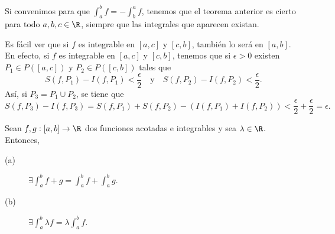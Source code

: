 \begin{observation}
\normalfont Si convenimos para que $\displaystyle \int^{b}_{a} f = - \int^{a}_{b} f $, tenemos que el teorema anterior es cierto para todo $\displaystyle a,b,c \in \R $, siempre que las integrales que aparecen existan.
\end{observation}
\begin{observation}
	\normalfont Es fácil ver que si $\displaystyle f $ es integrable en $\displaystyle \left[a,c\right]  $ y $\displaystyle \left[c,b\right]  $, también lo será en $\displaystyle \left[a,b\right]  $. En efecto, si $\displaystyle f $ es integrable en $\displaystyle \left[a,c\right]  $ y $\displaystyle \left[c,b\right]  $, tenemos que si $\displaystyle \epsilon > 0 $ existen $\displaystyle P_{1} \in P\left(\left[a,c\right] \right) $ y $\displaystyle P_{2} \in P\left(\left[c,b\right] \right) $ tales que
	\[ S\left(f,P_{1}\right)-I\left(f,P_{1}\right) < \frac{\epsilon }{2} \quad \text{y} \quad S\left(f,P_{2}\right)-I\left(f,P_{2}\right) < \frac{\epsilon }{2} .\]
	Así, si $\displaystyle P_{3} = P_{1} \cup P_{2} $, se tiene que
	\[ S\left(f,P_{3}\right)-I\left(f,P_{3}\right) = S\left(f,P_{1}\right) + S\left(f,P_{2}\right)-\left(I\left(f,P_{1}\right) + I\left(f,P_{2}\right)\right) < \frac{\epsilon }{2} + \frac{\epsilon }{2} = \epsilon.\]
\end{observation}
\begin{ftheorem}[]
	\normalfont Sean $\displaystyle f,g : \left[a,b\right]  \to \R $ dos funciones acotadas e integrables y sea $\displaystyle \lambda \in \R $. Entonces,
	\begin{description}
	\item[(a)] $\displaystyle \exists \int^{b}_{a} f + g = \int^{b}_{a} f + \int^{b}_{a} g $.
	\item[(b)] $\displaystyle \exists \int^{b}_{a} \lambda f = \lambda \int^{b}_{a} f $.
	\end{description}
\end{ftheorem}
